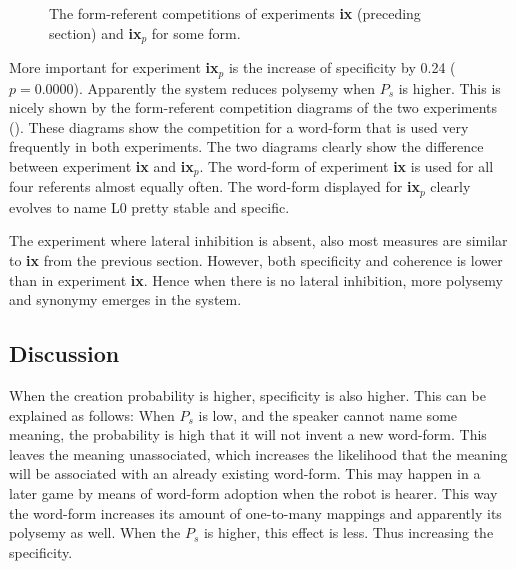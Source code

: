 \begin{figure}[t]
\centering
{}
\caption{The form-referent competitions of experiments {\bf ix} (preceding section) and {\bf ix$_p$} for some form.}
\label{f:par:FR-comp}
\end{figure}

More important for experiment {\bf ix$_p$} is the increase of specificity by 0.24 ($p=0.0000$). Apparently the system reduces polysemy when $P_s$ is higher. This is nicely shown by the form-referent competition diagrams of the two experiments (). These diagrams show the competition for a word-form that is used very frequently in both experiments. The two diagrams clearly show the difference between experiment {\bf ix} and {\bf ix$_p$}. The word-form of experiment {\bf ix} is used for all four referents almost equally often. The word-form displayed for {\bf ix$_p$} clearly evolves to name L0 pretty stable and specific.


The experiment where lateral inhibition is absent, also most measures are similar to {\bf ix} from the previous section. However, both specificity and coherence is lower than in experiment {\bf ix}. Hence when there is no lateral inhibition, more polysemy and synonymy emerges in the system.

\subsection{Discussion}

When the creation probability is higher, specificity is also higher. This can be explained as follows: When $P_s$ is low, and the speaker cannot name some meaning, the probability is high that it will not invent a new word-form. This leaves the meaning unassociated, which increases the likelihood that the meaning will be associated with an already existing word-form. This may happen in a later game by means of word-form adoption when the robot is hearer. This way the word-form increases its amount of one-to-many mappings and apparently its polysemy as well. When the $P_s$ is higher, this effect is less. Thus increasing the specificity.


